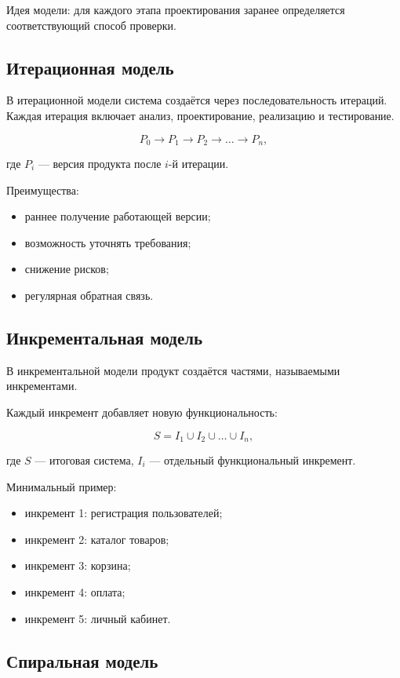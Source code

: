 \documentclass[12pt,a4paper]{article}
\begin{document}
Идея модели: для каждого этапа проектирования заранее определяется соответствующий способ проверки.

\subsection{Итерационная модель}

В итерационной модели система создаётся через последовательность итераций. Каждая итерация включает анализ, проектирование, реализацию и тестирование.

\[
P_0 \rightarrow P_1 \rightarrow P_2 \rightarrow \dots \rightarrow P_n,
\]

где $P_i$ --- версия продукта после $i$-й итерации.

Преимущества:
\begin{itemize}
    \item раннее получение работающей версии;
    \item возможность уточнять требования;
    \item снижение рисков;
    \item регулярная обратная связь.
\end{itemize}

\subsection{Инкрементальная модель}

В инкрементальной модели продукт создаётся частями, называемыми инкрементами.

Каждый инкремент добавляет новую функциональность:

\[
S = I_1 \cup I_2 \cup \dots \cup I_n,
\]

где $S$ --- итоговая система, $I_i$ --- отдельный функциональный инкремент.

Минимальный пример:
\begin{itemize}
    \item инкремент 1: регистрация пользователей;
    \item инкремент 2: каталог товаров;
    \item инкремент 3: корзина;
    \item инкремент 4: оплата;
    \item инкремент 5: личный кабинет.
\end{itemize}

\subsection{Спиральная модель}
\end{document}
